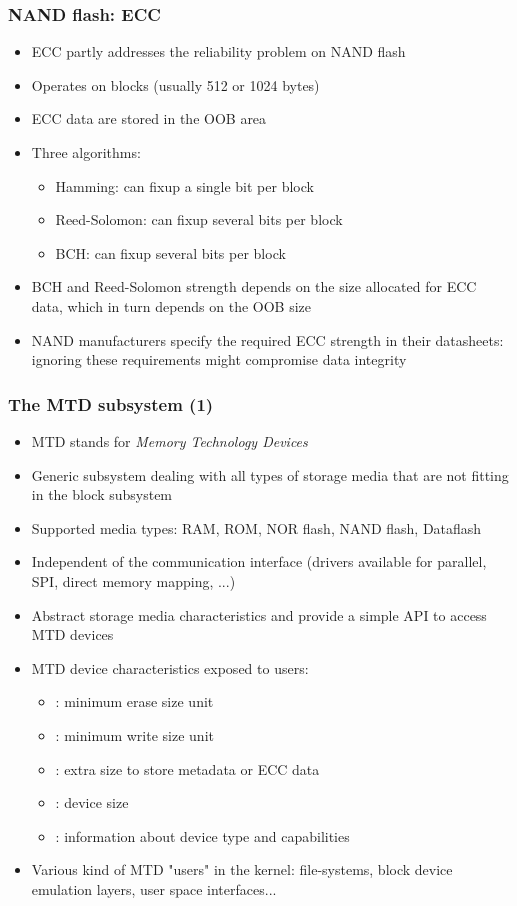 \begin{frame}
  \frametitle{NAND flash: ECC}
  \begin{itemize}
  \item ECC partly addresses the reliability problem on NAND flash
  \item Operates on blocks (usually 512 or 1024 bytes)
  \item ECC data are stored in the OOB area
  \item Three algorithms:
    \begin{itemize}
    \item Hamming: can fixup a single bit per block
    \item Reed-Solomon: can fixup several bits per block
    \item BCH: can fixup several bits per block
    \end{itemize}
  \item BCH and Reed-Solomon strength depends on the size allocated
    for ECC data, which in turn depends on the OOB size
  \item NAND manufacturers specify the required ECC strength in their
    datasheets: ignoring these requirements might compromise data
    integrity
  \end{itemize}
\end{frame}

\begin{frame}
  \frametitle{The MTD subsystem (1)}
  \begin{itemize}
  \item MTD stands for {\em Memory Technology Devices}
  \item Generic subsystem dealing with all types of storage media that
    are not fitting in the block subsystem
  \item Supported media types: RAM, ROM, NOR flash, NAND flash,
    Dataflash
  \item Independent of the communication interface (drivers available
    for parallel, SPI, direct memory mapping, ...)
  \item Abstract storage media characteristics and provide a simple
    API to access MTD devices
  \item MTD device characteristics exposed to users:
    \begin{itemize}
    \item {}: minimum erase size unit
    \item {}: minimum write size unit
    \item {}: extra size to store metadata or ECC data
    \item {}: device size
    \item {}: information about device type and capabilities
    \end{itemize}
  \item Various kind of MTD "users" in the kernel: file-systems, block
    device emulation layers, user space interfaces...
  \end{itemize}
\end{frame}

